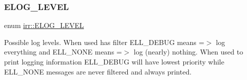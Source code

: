 \subsubsection{\texorpdfstring{E\+L\+O\+G\+\_\+\+L\+E\+V\+EL}{ELOG\_LEVEL}\hspace{0.1cm}{\footnotesize\ttfamily [2/2]}}
{\footnotesize\ttfamily enum \hyperlink{namespaceirr_aa2d1cac68606a25ed24cfffccfa30a92}{irr\+::\+E\+L\+O\+G\+\_\+\+L\+E\+V\+EL}}



Possible log levels. When used has filter E\+L\+L\+\_\+\+D\+E\+B\+UG means =$>$ log everything and E\+L\+L\+\_\+\+N\+O\+NE means =$>$ log (nearly) nothing. When used to print logging information E\+L\+L\+\_\+\+D\+E\+B\+UG will have lowest priority while E\+L\+L\+\_\+\+N\+O\+NE messages are never filtered and always printed. 

